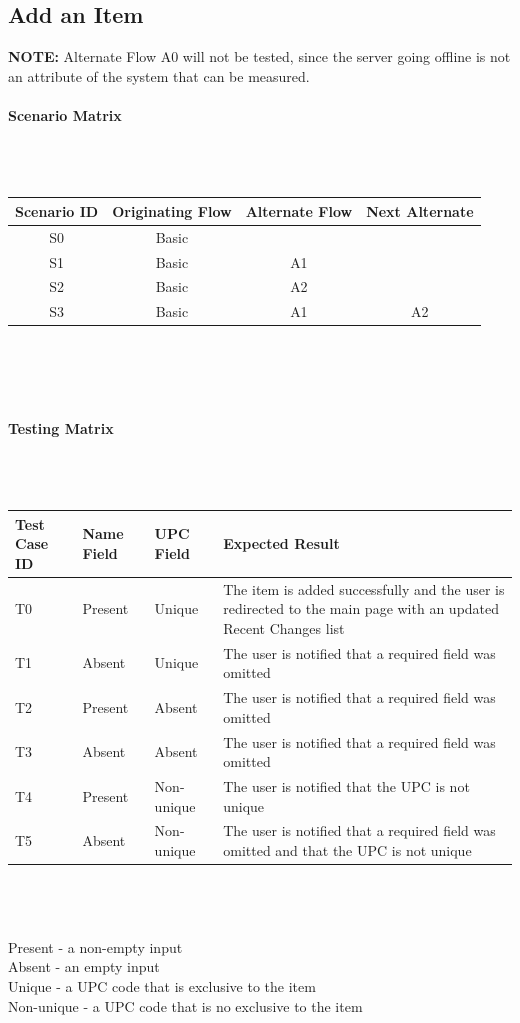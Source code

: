 \documentclass{article}
\begin{document}
\subsection{Add an Item}
\textbf{NOTE:} Alternate Flow A0 will not be tested, since the server going offline is not an attribute of the system that can be measured.\label{flow}

\paragraph{Scenario Matrix}~\\ \\
\begin{tabular}{ c  c  c  c }
\hline
Scenario ID & Originating Flow & Alternate Flow & Next Alternate\label{scenario}\\
\hline
\hline
S0 & Basic &  & \\
\hline
S1 & Basic & A1 & \\
\hline
S2 & Basic & A2 & \\
\hline
S3 & Basic & A1 & A2\\
\hline
\end{tabular}\\
~\\
~\\
\paragraph{Testing Matrix}~\\ \\
\begin{tabular}{ p{0.8in}  p{0.7in}  p{0.7in}  p{3.3in} }
\hline
Test Case ID & Name Field & UPC Field & Expected Result\\
\hline
\hline
T0 & Present & Unique & The item is added successfully and the user is redirected to the main page with an updated Recent Changes list\\
\hline
T1 & Absent & Unique & The user is notified that a required field was omitted\\
\hline
T2 & Present & Absent & The user is notified that a required field was omitted\\
\hline
T3 & Absent & Absent & The user is notified that a required field was omitted\\
\hline
T4 & Present & Non-unique & The user is notified that the UPC is not unique\\
\hline
T5 & Absent & Non-unique & The user is notified that a required field was omitted and that the UPC is not unique\\
\hline
\end{tabular}\\
~\\
~\\
Present - a non-empty input\\
Absent - an empty input\\
Unique - a UPC code that is exclusive to the item\\
Non-unique - a UPC code that is no exclusive to the item
\end{document}
